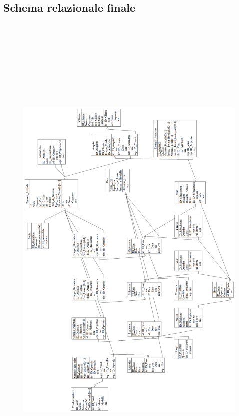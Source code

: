 \documentclass{article}
\begin{document}
\subsection{Schema relazionale finale}
\begin{figure}[htbp]
\centering
\includegraphics[height=25cm,width=1\textwidth]{img/Schema_Finale_Logica}
\end{figure}
\newpage
\end{document}

